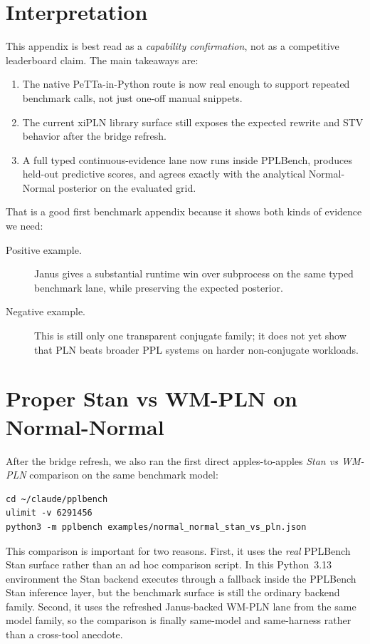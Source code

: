 \documentclass[11pt,openany]{report}
\begin{document}
\section{Interpretation}

This appendix is best read as a \emph{capability confirmation}, not as a
competitive leaderboard claim.  The main takeaways are:
\begin{enumerate}
\item The native PeTTa-in-Python route is now real enough to support repeated
benchmark calls, not just one-off manual snippets.
\item The current xiPLN library surface still exposes the expected rewrite and
STV behavior after the bridge refresh.
\item A full typed continuous-evidence lane now runs inside PPLBench, produces
held-out predictive scores, and agrees exactly with the analytical
Normal-Normal posterior on the evaluated grid.
\end{enumerate}

That is a good first benchmark appendix because it shows both kinds of
evidence we need:
\begin{description}
\item[Positive example.] Janus gives a substantial runtime win over subprocess
on the same typed benchmark lane, while preserving the expected posterior.
\item[Negative example.] This is still only one transparent conjugate family;
it does not yet show that PLN beats broader PPL systems on harder
non-conjugate workloads.
\end{description}

\section{Proper Stan vs WM-PLN on Normal-Normal}
\label{app:pplbench-stan-pln}

After the bridge refresh, we also ran the first direct apples-to-apples
\emph{Stan vs WM-PLN} comparison on the same benchmark model:
\begin{lstlisting}
cd ~/claude/pplbench
ulimit -v 6291456
python3 -m pplbench examples/normal_normal_stan_vs_pln.json
\end{lstlisting}

This comparison is important for two reasons.
First, it uses the \emph{real} PPLBench Stan surface rather than an ad hoc
comparison script.  In this Python~3.13 environment the Stan backend executes
through a  fallback inside the PPLBench Stan inference layer,
but the benchmark surface is still the ordinary 
backend family.  Second, it uses the refreshed Janus-backed WM-PLN lane from
the same  model family, so the comparison is finally
same-model and same-harness rather than a cross-tool anecdote.
\end{document}
